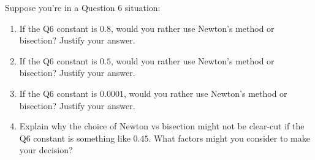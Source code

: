 \documentclass{article}
\begin{document}
\begin{problem}
    Suppose you're in a Question 6 situation:
    \begin{enumerate}
        \item If the Q6 constant is \(0.8\), would you rather use Newton's method or bisection? Justify your answer.
        \item If the Q6 constant is \(0.5\), would you rather use Newton's method or bisection? Justify your answer.
        \item If the Q6 constant is \(0.0001\), would you rather use Newton's method or bisection? Justify your answer.
        \item Explain why the choice of Newton vs bisection might not be clear-cut if the Q6 constant is something like \(0.45\). What factors might you consider to make your decision?
    \end{enumerate}

\end{problem}
\end{document}
